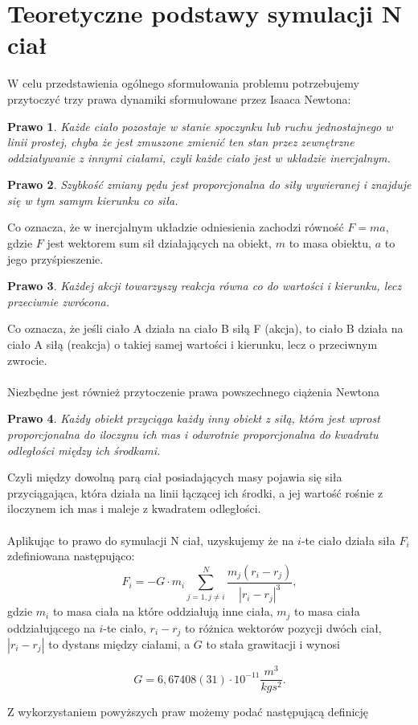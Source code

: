 \documentclass[14pt,twoside,a4paper]{article}
\newtheorem{theorem}{Prawo}
\theoremstyle{definition}
\begin{document}
\section{\LARGE Teoretyczne podstawy symulacji N ciał}

W celu przedstawienia ogólnego sformułowania problemu potrzebujemy przytoczyć trzy prawa dynamiki sformułowane przez Isaaca Newtona: \cite[str.~3-4]{fund}

\begin{theorem}
Każde ciało pozostaje w stanie spoczynku lub ruchu jednostajnego w linii prostej, chyba że jest zmuszone zmienić ten stan przez zewnętrzne oddziaływanie z innymi ciałami, czyli każde ciało jest w układzie inercjalnym.
\end{theorem}

\begin{theorem}
Szybkość zmiany pędu jest proporcjonalna do siły wywieranej i znajduje się w tym samym kierunku co siła.
\end{theorem}
Co oznacza, że w inercjalnym układzie odniesienia zachodzi równość $F=ma$, gdzie $F$ jest wektorem sum sił działających na obiekt, $m$ to masa obiektu, $a$ to jego przyśpieszenie.

\begin{theorem}
Każdej akcji towarzyszy reakcja równa co do wartości i kierunku, lecz przeciwnie zwrócona.
\end{theorem} 
Co oznacza, że jeśli ciało A działa na ciało B siłą F (akcja), to ciało B działa na ciało A siłą (reakcja) o takiej samej wartości i kierunku, lecz o przeciwnym zwrocie.\\~\\


Niezbędne jest również przytoczenie prawa powszechnego ciążenia Newtona \cite[str.~4-5]{fund}
\begin{theorem}
Każdy obiekt przyciąga każdy inny obiekt z siłą, która jest wprost proporcjonalna do iloczynu ich mas i odwrotnie proporcjonalna do kwadratu odległości między ich środkami.
\end{theorem}
Czyli między dowolną parą ciał posiadających masy pojawia się siła przyciągająca, która działa na linii łączącej ich środki, a jej wartość rośnie z iloczynem ich mas i maleje z kwadratem odległości.\\~\\

Aplikując to prawo do symulacji N ciał, uzyskujemy że na $i$-te ciało działa siła $F_i$ zdefiniowana następująco:\\
$$F_i = -G\cdot m_i \sum_{j=1, j\neq i}^N \frac{m_j(r_i - r_j)}{|r_i - r_j|^3},$$gdzie $m_i$ to masa ciała na które oddziałują inne ciała, $m_j$ to masa ciała oddziałującego na $i$-te ciało, $r_i - r_j$ to różnica wektorów pozycji dwóch ciał, $|r_i - r_j|$ to dystans między ciałami, a $G$ to stała grawitacji i wynosi
\begin{center}
$$G = 6,67408(31)\cdot 10^{-11} \frac{m^{3}}{kg s^2}.$$
\end{center}
Z wykorzystaniem powyższych praw możemy podać następującą definicję
\end{document}
